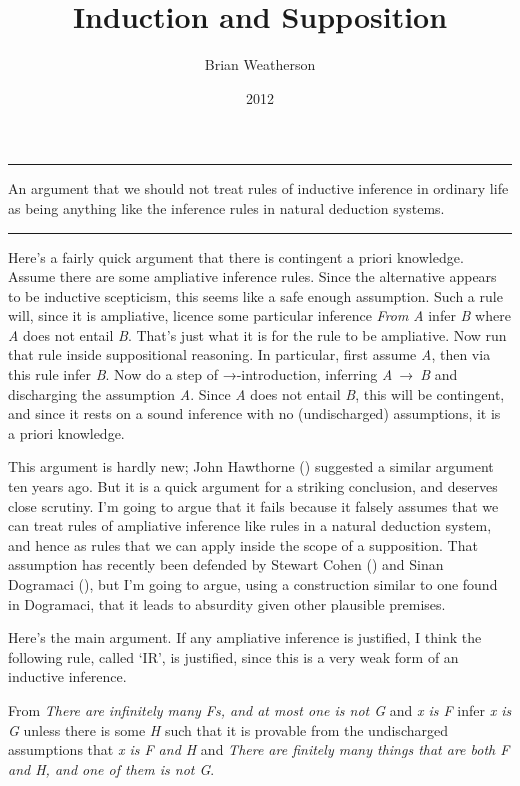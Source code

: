 \documentclass[
  10pt,
  letterpaper,
  DIV=11,
  numbers=noendperiod,
  twoside]{scrartcl}
\title{Induction and Supposition}
\author{Brian Weatherson}
\date{2012}
\providecommand{\tightlist}{%
  \setlength{\itemsep}{0pt}\setlength{\parskip}{0pt}}\usepackage{longtable,booktabs,array}
\renewenvironment{abstract}
 {\vspace{-1.25cm}
 \quotation\small\noindent\rule{\linewidth}{.5pt}\par\smallskip
 \noindent }
 {\par\noindent\rule{\linewidth}{.5pt}\endquotation}
\begin{document}
\maketitle
\begin{abstract}
An argument that we should not treat rules of inductive inference in
ordinary life as being anything like the inference rules in natural
deduction systems.
\end{abstract}

Here's a fairly quick argument that there is contingent a priori
knowledge. Assume there are some ampliative inference rules. Since the
alternative appears to be inductive scepticism, this seems like a safe
enough assumption. Such a rule will, since it is ampliative, licence
some particular inference \emph{From} \emph{A} infer \emph{B} where
\emph{A} does not entail \emph{B}. That's just what it is for the rule
to be ampliative. Now run that rule inside suppositional reasoning. In
particular, first assume \emph{A}, then via this rule infer \emph{B}.
Now do a step of →-introduction, inferring \emph{A}~→~\emph{B} and
discharging the assumption \emph{A}. Since \emph{A} does not entail
\emph{B}, this will be contingent, and since it rests on a sound
inference with no (undischarged) assumptions, it is a priori knowledge.

This argument is hardly new; John Hawthorne
() suggested a similar argument ten
years ago. But it is a quick argument for a striking conclusion, and
deserves close scrutiny. I'm going to argue that it fails because it
falsely assumes that we can treat rules of ampliative inference like
rules in a natural deduction system, and hence as rules that we can
apply inside the scope of a supposition. That assumption has recently
been defended by Stewart Cohen () and
Sinan Dogramaci (), but I'm going to
argue, using a construction similar to one found in Dogramaci, that it
leads to absurdity given other plausible premises.

Here's the main argument. If any ampliative inference is justified, I
think the following rule, called `IR', is justified, since this is a
very weak form of an inductive inference.

\begin{description}
\tightlist
\item[IR]
From \emph{There are infinitely many Fs, and at most one is not G} and
\emph{x is F} infer \emph{x is G} unless there is some \emph{H} such
that it is provable from the undischarged assumptions that \emph{x is F
and H} and \emph{There are finitely many things that are both F and H,
and one of them is not G}.
\end{description}
\end{document}
